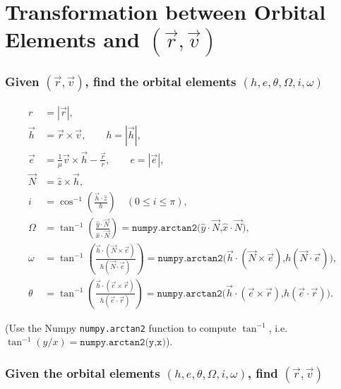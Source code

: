 \documentclass[10pt]{article}
\date{}
\newcommand{\parenth}[1]{\ensuremath{\left( #1 \right)}}
\theoremstyle{plain}\theorembodyfont{\normalfont}
\begin{document}
\pagestyle{empty}
\section*{Transformation between Orbital Elements and $(\vec r, \vec v)$}

\subsubsection*{Given $(\vec r, \vec v)$, find the orbital elements $(h,e,\theta,\Omega,i,\omega)$}

\begin{align*}
r & = |\vec r|,\\ 
\vec h & = \vec r \times \vec v,\qquad h = |\vec h|,\\
\vec e & = \frac{1}{\mu} \vec v \times \vec h - \frac{\vec r}{r},\qquad e = | \vec e|,\\
\vec N & = \hat z \times \vec h,\\
i & = \cos^{-1} \parenth{\frac{\vec h\cdot \hat z}{h}}\quad (0\leq i \leq \pi),\\
\Omega & = \tan^{-1} \parenth{\frac{\hat y \cdot \vec N}{\hat x \cdot \vec N}}
=\texttt{numpy.arctan2(}{{\hat y \cdot \vec N}\texttt{,}{\hat x \cdot \vec N}}\texttt{)},\\
\omega & = \tan^{-1} \parenth{\frac{\vec h \cdot (\vec N \times \vec e)}{h (\vec N \cdot \vec e)}}
=\texttt{numpy.arctan2(}{{\vec h \cdot (\vec N \times \vec e)}\texttt{,}{h (\vec N \cdot \vec e)}}\texttt{)},\\
\theta & = \tan^{-1} \parenth{\frac{\vec h \cdot (\vec e \times \vec r)}{h (\vec e \cdot \vec r)}}=\texttt{numpy.arctan2(}{{\vec h \cdot (\vec e \times \vec r)}\texttt{,}{h (\vec e \cdot \vec r)}}\texttt{)}.
\end{align*}

\noindent (Use the Numpy \texttt{numpy.arctan2} function to compute $\tan^{-1}$, i.e. $\tan^{-1}(y/x) =\texttt{numpy.arctan2(y,x)}$).\\


\subsubsection*{Given the orbital elements $(h,e,\theta,\Omega,i,\omega)$, find $(\vec r, \vec v)$}
\end{document}
